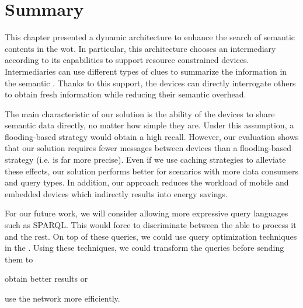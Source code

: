\section{Summary}
\label{sec:search_summary}

This chapter presented a dynamic architecture to enhance the search of semantic contents in the \acl{wot}.
In particular, this architecture chooses an intermediary according to its capabilities to support resource constrained devices.
Intermediaries can use different types of clues to summarize the information in the semantic \Space{}.
Thanks to this support, the devices can directly interrogate others to obtain fresh information while reducing their semantic overhead.

The main characteristic of our solution is the ability of the devices to share semantic data directly, no matter how simple they are. %
Under this assumption, a flooding-based strategy would obtain a high recall. %
However, our evaluation shows that our solution requires fewer messages between devices than a flooding-based strategy (i.e. is far more precise).
Even if we use caching strategies to alleviate these effects, our solution performs better for scenarios with more data consumers and query types.
In addition, our approach reduces the workload of mobile and embedded devices which indirectly results into energy savings.

For our future work, we will consider allowing more expressive query languages such as SPARQL. %
This would force \consumers{} to discriminate between the \providers{} able to process it and the rest.
On top of these queries, we could use query optimization techniques in the \consumers{} \citep{schwarte_fedx_optimization_2011}.
Using these techniques, we could transform the queries before sending them to
\begin{enumerate*}[label=\itshape(\alph*\upshape)]
  \item obtain better results or
  \item use the network more efficiently.
\end{enumerate*}